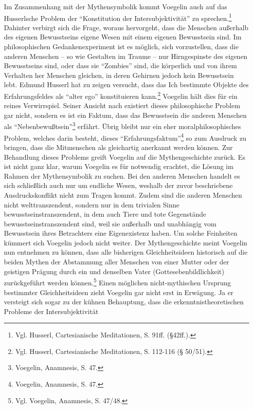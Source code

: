 Im Zusammenhang mit der Mythensymbolik kommt Voegelin auch auf das Husserlsche
Problem der "`Konstitution der Intersubjektivität"' zu sprechen.\footnote{Vgl.
  Husserl, Cartesianische Meditationen, S. 91ff.  (§42ff.).} Dahinter verbirgt
sich die Frage, woraus hervorgeht, dass die Menschen außerhalb des eigenen
Bewusstseins eigene Wesen mit einem eigenen Bewusstsein sind. Im
philosophischen Gedankenexperiment ist es möglich, sich vorzustellen, dass die
anderen Menschen -- so wie Gestalten im Traume -- nur Hirngespinste des eigenen
Bewusstseins sind, oder dass sie "`Zombies"' sind, die körperlich und von
ihrem Verhalten her Menschen gleichen, in deren Gehirnen jedoch kein
Bewusstsein lebt. Edmund Husserl hat zu zeigen versucht, dass das Ich
bestimmte Objekte des Erfahrungsfeldes als "`alter ego"' konstituieren
kann.\footnote{Vgl.  Husserl, Cartesianische Meditationen, S. 112-116 (§
  50/51).} Voegelin hält dies für ein reines Verwirrspiel. Seiner Ansicht nach
existiert dieses philosophische Problem gar nicht, sondern es ist ein Faktum,
dass das Bewusstsein die anderen Menschen als
"`Nebenbewußtsein"'\footnote{Voegelin, Anamnesis, S. 47.} erfährt. Übrig
bleibt nur ein eher moralphilosophisches Problem, welches darin besteht,
dieses "`Erfahrungsfaktum"'\footnote{Voegelin, Anamnesis, S. 47.} so zum
Ausdruck zu bringen, dass die Mitmenschen als gleichartig anerkannt werden
können. Zur Behandlung dieses Problems greift Voegelin auf die
Mythengeschichte zurück. Es ist nicht ganz klar, warum Voegelin es für
notwendig erachtet, die Lösung im Rahmen der Mythensymbolik zu suchen.  Bei
den anderen Menschen handelt es sich schließlich auch nur um endliche Wesen,
weshalb der zuvor beschriebene Ausdruckskonflikt nicht zum Tragen kommt. Zudem
sind die anderen Menschen nicht welttranszendent, sondern nur in dem trivialen
Sinne bewusstseinstranszendent, in dem auch Tiere und tote Gegenstände
bewusstseinstranszendent sind, weil sie außerhalb und unabhängig vom
Bewusstsein ihres Betrachters eine Eigenexistenz haben.  Um solche Feinheiten
kümmert sich Voegelin jedoch nicht weiter. Der Mythengeschichte meint Voegelin
nun entnehmen zu können, dass alle bisherigen Gleichheitsideen historisch auf
die beiden Mythen der Abstammung aller Menschen von einer Mutter oder der
geistigen Prägung durch ein und denselben Vater (Gottesebenbildlichkeit)
zurückgeführt werden können.\footnote{Vgl.  Voegelin, Anamnesis, S. 47/48.}
Einen möglichen nicht-mythischen Ursprung bestimmter Gleichheitsideen zieht
Voegelin gar nicht erst in Erwägung. Ja er versteigt sich sogar zu der kühnen
Behauptung, dass die erkenntnistheoretischen Probleme der Intersubjektivität
